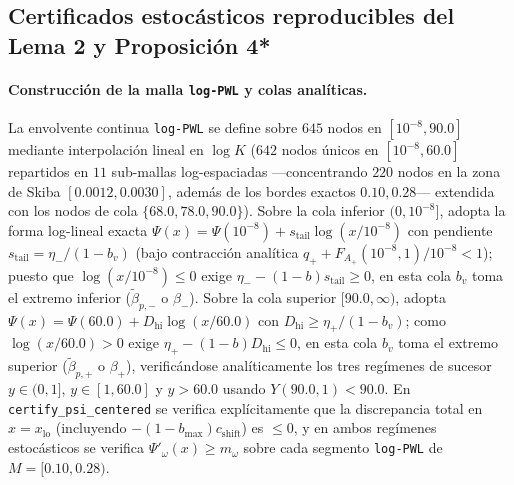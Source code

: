 \documentclass[11pt,letterpaper]{article}
\theoremstyle{plain}
\begin{document}
\subsection{\texorpdfstring{Certificados estocásticos reproducibles del Lema 2 y Proposición 4*}{Certificados estocásticos reproducibles del Lema 2 y Proposición 4*}}

\paragraph{Construcción de la malla \texttt{log-PWL} y colas analíticas.} La envolvente continua \texttt{log-PWL} se define sobre $645$ nodos en $[10^{-8},90.0]$ mediante interpolación lineal en $\log K$ ($642$ nodos únicos en $[10^{-8},60.0]$ repartidos en $11$ sub-mallas log-espaciadas ---concentrando $220$ nodos en la zona de Skiba $[0.0012,0.0030]$, además de los bordes exactos $0.10, 0.28$--- extendida con los nodos de cola $\{68.0, 78.0, 90.0\}$). Sobre la cola inferior $(0,10^{-8}]$, adopta la forma log-lineal exacta $\Psi(x)=\Psi(10^{-8})+s_{\mathrm{tail}}\log(x/10^{-8})$ con pendiente $s_{\mathrm{tail}}=\eta_-/(1-b_v)$ (bajo contracción analítica $q_+ + F_{A_+}(10^{-8},1)/10^{-8}<1$); puesto que $\log(x/10^{-8})\le 0$ exige $\eta_- - (1-b)s_{\mathrm{tail}}\ge 0$, en esta cola $b_v$ toma el extremo inferior ($\tilde{\beta}_{p,-}$ o $\beta_-$). Sobre la cola superior $[90.0,\infty)$, adopta $\Psi(x)=\Psi(60.0)+D_{\mathrm{hi}}\log(x/60.0)$ con $D_{\mathrm{hi}}\ge \eta_+/(1-b_v)$; como $\log(x/60.0)>0$ exige $\eta_+ - (1-b)D_{\mathrm{hi}}\le 0$, en esta cola $b_v$ toma el extremo superior ($\tilde{\beta}_{p,+}$ o $\beta_+$), verificándose analíticamente los tres regímenes de sucesor $y\in(0,1]$, $y\in[1,60.0]$ y $y>60.0$ usando $Y(90.0,1)<90.0$. En \texttt{certify\_psi\_centered} se verifica explícitamente que la discrepancia total en $x=x_{\mathrm{lo}}$ (incluyendo $-(1-b_{\max})c_{\mathrm{shift}}$) es $\le 0$, y en ambos regímenes estocásticos se verifica $\Psi'_\omega(x)\ge m_\omega$ sobre cada segmento \texttt{log-PWL} de $M=[0.10,0.28)$.
\end{document}
